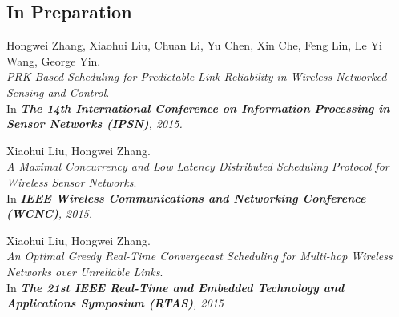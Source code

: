 \subsection{In Preparation}
\begin{thebibliography}{2}
Hongwei Zhang, Xiaohui Liu, Chuan Li, Yu Chen, Xin Che, Feng Lin, Le Yi Wang, George Yin.
\\ \newblock \emph{PRK-Based Scheduling for Predictable Link Reliability in Wireless Networked Sensing and Control}.
\\ \newblock In \emph{\textbf{The 14th International Conference on Information Processing in Sensor Networks (IPSN)}, 2015.}

Xiaohui Liu, Hongwei Zhang.
\\ \newblock \emph{A Maximal Concurrency and Low Latency Distributed Scheduling Protocol for Wireless Sensor Networks}.
\\ \newblock In \emph{\textbf{IEEE Wireless Communications and Networking Conference (WCNC)}, 2015.}

Xiaohui Liu, Hongwei Zhang.
\\ \newblock \emph{An Optimal Greedy Real-Time Convergecast Scheduling for Multi-hop Wireless Networks over Unreliable Links}.
\\ \newblock In \emph{\textbf{The 21st IEEE Real-Time and Embedded Technology and Applications Symposium (RTAS)}, 2015}

\end{thebibliography}
